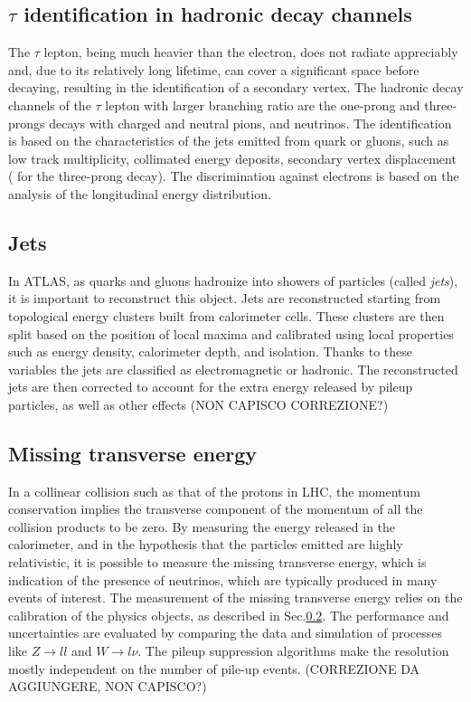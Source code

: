 \documentclass[a4paper,twoside,12pt]{article}
\begin{document}
\subsection{$\tau$ identification in hadronic decay channels}
The $\tau$ lepton, being much heavier than the electron, does not radiate appreciably and, due to its relatively long lifetime, can cover a significant 
space before decaying, resulting in the identification of a secondary vertex.
The hadronic decay channels of the $\tau$ lepton with larger branching ratio are the 
one-prong and three-prongs decays with charged and neutral pions, and neutrinos. The
identification is based on the characteristics of the jets emitted from quark or gluons, such 
as low track multiplicity, collimated energy deposits, secondary vertex displacement (
for the three-prong decay). The discrimination against electrons is based on the analysis
of the longitudinal energy distribution. 

\subsection{Jets}\label{subsec:jets}
In ATLAS, as quarks and gluons hadronize into showers of particles (called \textit{jets}), it is important to reconstruct this object. Jets are reconstructed starting from topological energy clusters built from calorimeter cells. These clusters are then split based on the position of local maxima and calibrated using
local properties such as energy density, calorimeter depth, and isolation. Thanks to these 
variables the jets are classified as electromagnetic or hadronic. The reconstructed jets are
then corrected to account for the extra energy released by pileup particles, as well as other effects (NON CAPISCO CORREZIONE?)

\subsection{Missing transverse energy}
In a collinear collision such as that of the protons in LHC, the momentum conservation 
implies the transverse component of the momentum of all the collision products to be zero. 
By measuring the energy released in the calorimeter, and in the hypothesis that the particles emitted are highly relativistic, it is possible to measure the missing transverse energy, 
which is indication of the presence of neutrinos, which are typically produced in many events 
of interest. The measurement of the missing transverse energy relies on the calibration of the 
physics objects, as described in Sec.\ref{subsec:jets}. The performance and uncertainties are 
evaluated by comparing the data and simulation of processes like $Z \rightarrow ll$ and 
$W \rightarrow l\nu$. The pileup suppression algorithms make the resolution mostly independent on
the number of pile-up events. (CORREZIONE DA AGGIUNGERE, NON CAPISCO?)
\end{document}

